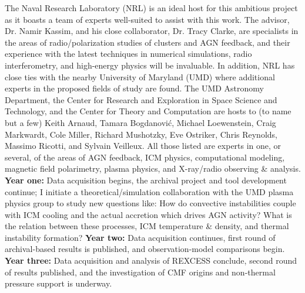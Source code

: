 \indent The Naval Research Laboratory (NRL) is an ideal host for this
ambitious project as it boasts a team of experts well-suited to assist
with this work. The advisor, Dr. Namir Kassim, and his close
collaborator, Dr. Tracy Clarke, are specialists in the areas of
radio/polarization studies of clusters and AGN feedback, and their
experience with the latest techniques in numerical simulations, radio
interferometry, and high-energy physics will be invaluable. In
addition, NRL has close ties with the nearby University of Maryland
(UMD) where additional experts in the proposed fields of study are
found. The UMD Astronomy Department, the Center for Research and
Exploration in Space Science and Technology, and the Center for Theory
and Computation are hosts to (to name but a few) Keith Arnaud, Tamara
Bogdanovi{\'c}, Michael Loewenstein, Craig Markwardt, Cole Miller,
Richard Mushotzky, Eve Ostriker, Chris Reynolds, Massimo Ricotti, and
Sylvain Veilleux. All those listed are experts in one, or several, of
the areas of AGN feedback, ICM physics, computational modeling,
magnetic field polarimetry, plasma physics, and X-ray/radio
observing \& analysis. {\bf{Year one:}} Data acquisition begins, the
archival project and tool development continue; I initiate a
theoretical/simulation collaboration with the UMD plasma physics group
to study new questions like: How do convective instabilities couple
with ICM cooling and the actual accretion which drives AGN activity?
What is the relation between these processes, ICM temperature \&
density, and thermal instability formation? {\bf{Year two:}} Data
acquisition continues, first round of archival-based results is
published, and observation-model comparisons begin. {\bf{Year three:}}
Data acquisition and analysis of REXCESS conclude, second round of
results published, and the investigation of CMF origins and
non-thermal pressure support is underway.
